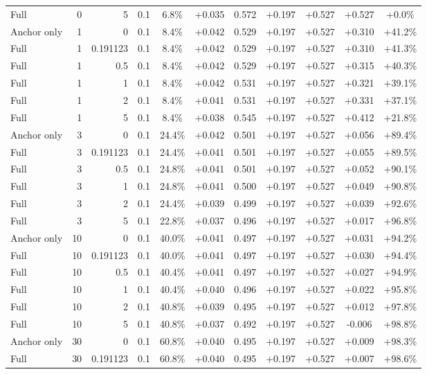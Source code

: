 \begin{table}[htbp]
\begin{tabular}{lrrrccccccc}
Full & 0 & 5 & 0.1 & 6.8\% & +0.035 & 0.572 & +0.197 & +0.527 & +0.527 & +0.0\% \\
Anchor only & 1 & 0 & 0.1 & 8.4\% & +0.042 & 0.529 & +0.197 & +0.527 & +0.310 & +41.2\% \\
Full & 1 & 0.191123 & 0.1 & 8.4\% & +0.042 & 0.529 & +0.197 & +0.527 & +0.310 & +41.3\% \\
Full & 1 & 0.5 & 0.1 & 8.4\% & +0.042 & 0.529 & +0.197 & +0.527 & +0.315 & +40.3\% \\
Full & 1 & 1 & 0.1 & 8.4\% & +0.042 & 0.531 & +0.197 & +0.527 & +0.321 & +39.1\% \\
Full & 1 & 2 & 0.1 & 8.4\% & +0.041 & 0.531 & +0.197 & +0.527 & +0.331 & +37.1\% \\
Full & 1 & 5 & 0.1 & 8.4\% & +0.038 & 0.545 & +0.197 & +0.527 & +0.412 & +21.8\% \\
Anchor only & 3 & 0 & 0.1 & 24.4\% & +0.042 & 0.501 & +0.197 & +0.527 & +0.056 & +89.4\% \\
Full & 3 & 0.191123 & 0.1 & 24.4\% & +0.041 & 0.501 & +0.197 & +0.527 & +0.055 & +89.5\% \\
Full & 3 & 0.5 & 0.1 & 24.8\% & +0.041 & 0.501 & +0.197 & +0.527 & +0.052 & +90.1\% \\
Full & 3 & 1 & 0.1 & 24.8\% & +0.041 & 0.500 & +0.197 & +0.527 & +0.049 & +90.8\% \\
Full & 3 & 2 & 0.1 & 24.4\% & +0.039 & 0.499 & +0.197 & +0.527 & +0.039 & +92.6\% \\
Full & 3 & 5 & 0.1 & 22.8\% & +0.037 & 0.496 & +0.197 & +0.527 & +0.017 & +96.8\% \\
Anchor only & 10 & 0 & 0.1 & 40.0\% & +0.041 & 0.497 & +0.197 & +0.527 & +0.031 & +94.2\% \\
Full & 10 & 0.191123 & 0.1 & 40.0\% & +0.041 & 0.497 & +0.197 & +0.527 & +0.030 & +94.4\% \\
Full & 10 & 0.5 & 0.1 & 40.4\% & +0.041 & 0.497 & +0.197 & +0.527 & +0.027 & +94.9\% \\
Full & 10 & 1 & 0.1 & 40.4\% & +0.040 & 0.496 & +0.197 & +0.527 & +0.022 & +95.8\% \\
Full & 10 & 2 & 0.1 & 40.8\% & +0.039 & 0.495 & +0.197 & +0.527 & +0.012 & +97.8\% \\
Full & 10 & 5 & 0.1 & 40.8\% & +0.037 & 0.492 & +0.197 & +0.527 & -0.006 & +98.8\% \\
Anchor only & 30 & 0 & 0.1 & 60.8\% & +0.040 & 0.495 & +0.197 & +0.527 & +0.009 & +98.3\% \\
Full & 30 & 0.191123 & 0.1 & 60.8\% & +0.040 & 0.495 & +0.197 & +0.527 & +0.007 & +98.6\% \\

\end{tabular}
\end{table}
